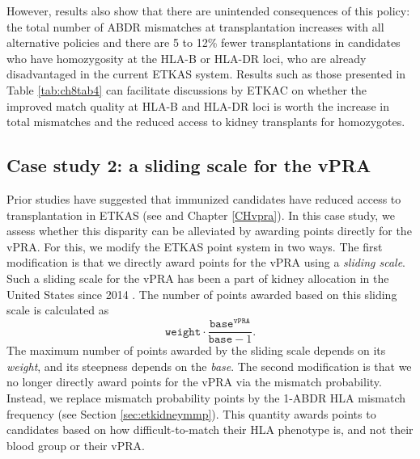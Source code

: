 \documentclass[11pt,twoside,]{book}
\begin{document}
\endgroup
\FloatBarrier

However, results also show that there are unintended consequences of
this policy: the total number of ABDR mismatches at transplantation
increases with all alternative policies and there are 5 to 12\% fewer
transplantations in candidates who have homozygosity at the HLA-B or HLA-DR
loci, who are already disadvantaged in the current ETKAS system. Results
such as those presented in Table \ref{tab:ch8tab4} can facilitate discussions by ETKAC
on whether the improved match quality at HLA-B and HLA-DR loci is worth the increase
in total mismatches and the reduced access to kidney transplants for homozygotes.

\subsection{Case study 2: a sliding scale for the vPRA}\label{sec:etkidneycasestudyvpra}

Prior studies have suggested that immunized candidates have reduced
access to transplantation in ETKAS (see \citep{ziemannUnacceptableHumanLeucocyte2017, zecherImpactSensitizationWaiting2022a} and Chapter \ref{CHvpra}).
In this case study, we assess whether this disparity can be alleviated
by awarding points directly for the vPRA. For this, we modify the ETKAS point
system in two ways. The first modification is that we directly award points for
the vPRA using a \emph{sliding scale}. Such a sliding scale for the vPRA has been a part of
kidney allocation in the United States since 2014 \citep{stewartSmoothingItOut2012}.
The number of points awarded based on this sliding scale is calculated as \[\texttt{weight}\cdot\frac{\texttt{base}^{\texttt{vPRA}}}{\texttt{base}-1}.\]
The maximum number of points awarded by the sliding scale depends on its \emph{weight},
and its steepness depends on the \emph{base}. The second modification is that we no longer directly award points for the vPRA via the mismatch probability.
Instead, we replace mismatch probability points by the 1-ABDR HLA mismatch frequency (see Section \ref{sec:etkidneymmp}). This quantity awards points to candidates based on
how difficult-to-match their HLA phenotype is, and not their blood group or
their vPRA.
\end{document}
